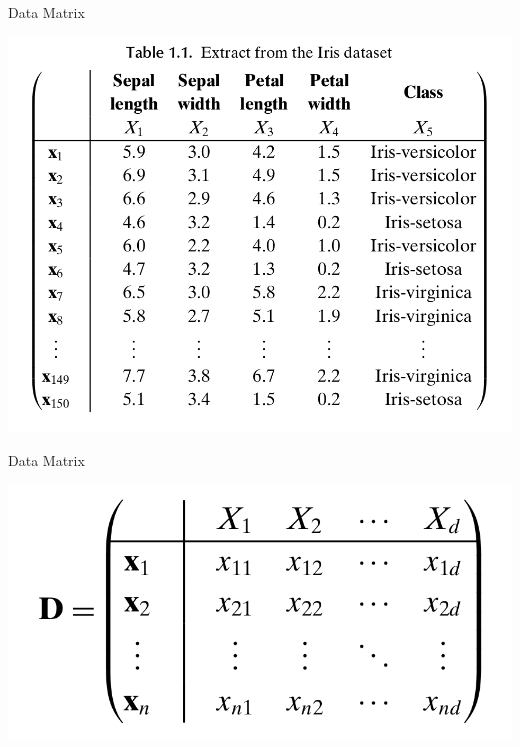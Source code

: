 \documentclass{beamer}
\begin{document}
\begin{frame}{Data Matrix}
    \begin{center}                                                                                                           
        \includegraphics[scale=0.23]{dataMatrixIris.png}                                                                    
    \end{center}                                                                                                             
\end{frame}   
\begin{frame}{Data Matrix}
    \begin{center}                                                                                                           
        \includegraphics[scale=0.38]{dataMatrix.png}                                                                    
    \end{center}                                                                                                             
\end{frame}   
\end{document}
